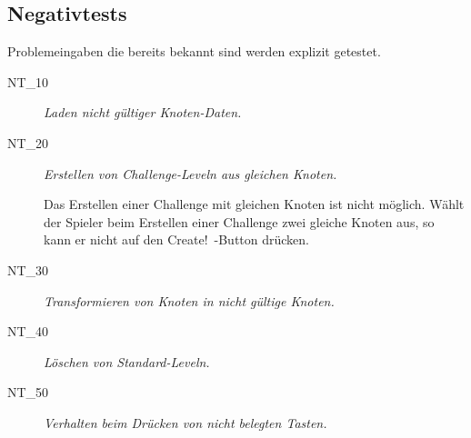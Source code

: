 %



\newpage



\subsection*{Negativtests}
\label{Abschnitt:Tests:Protokoll:Negativ}


Problemeingaben die bereits bekannt sind werden explizit getestet.\\

\begin{description}

	\item[NT\_10] \textit{Laden nicht gültiger Knoten-Daten.} \hfill\\
	
	\label{NT:10}
	
	
	
	\item[NT\_20] \textit{Erstellen von Challenge-Leveln aus gleichen Knoten.} \hfill\\
	
	\label{NT:20}
	
	Das Erstellen einer Challenge mit gleichen Knoten ist nicht möglich. Wählt der Spieler beim Erstellen einer Challenge zwei gleiche Knoten aus, so kann er nicht auf den \glqq Create!\grqq~-Button drücken.
	
	
	
	\item[NT\_30] \textit{Transformieren von Knoten in nicht gültige Knoten.} \hfill\\
	
	\label{NT:30}
	
	
	\item[NT\_40] \textit{Löschen von Standard-Leveln.} \hfill\\
	
	\label{NT:40}
	
	\item[NT\_50] \textit{Verhalten beim Drücken von nicht belegten Tasten.} \hfill\\
	
	\label{NT:50}	
	
\end{description}






